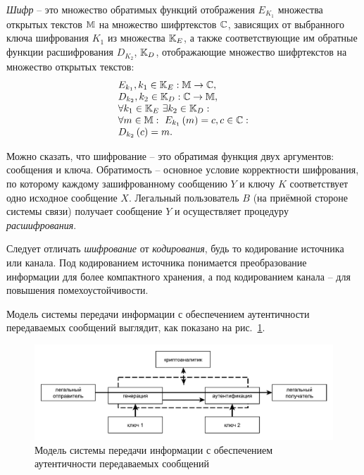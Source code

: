 \emph{Шифр} -- это множество обратимых функций отображения $E_{K_1}$ множества открытых текстов $\mathbb{M}$ на множество шифртекстов $\mathbb{C}$, зависящих от выбранного ключа шифрования $K_1$ из множества $\mathbb{K}_E$, а также соответствующие им обратные функции расшифрования $D_{K_2}$, $\mathbb{K}_D$, отображающие множество шифртекстов на множество открытых текстов:
\begin{equation}\label{eq:Encryption}\begin{array}{l}
	E_{k_1}, k_1 \in \mathbb{K}_E: \mathbb{M} \to \mathbb{C}, \\
	D_{k_2}, k_2 \in \mathbb{K}_D: \mathbb{C} \to \mathbb{M}, \\
	\forall k_1 \in \mathbb{K}_E ~ \exists k_2 \in \mathbb{K}_D: \\
	\forall m \in \mathbb{M}: ~ E_{k_1} \left( m \right) = c, c \in \mathbb{C}: \\
	D_{k_2} \left( c \right) = m.
\end{array}\end{equation}

Можно сказать, что шифрование -- это обратимая функция двух аргументов: сообщения и ключа. Обратимость -- основное условие корректности шифрования, по которому каждому зашифрованному сообщению $Y$ и ключу $K$ соответствует одно исходное сообщение $X$. Легальный пользователь $B$ (на приёмной стороне системы связи) получает сообщение $Y$ и осуществляет процедуру \emph{расшифрования}.

Следует отличать \emph{шифрование} от \emph{кодирования}, будь то кодирование источника или канала. Под кодированием источника понимается преобразование информации для более компактного хранения, а под кодированием канала -- для повышения помехоустойчивости.

Модель системы передачи информации с обеспечением аутентичности передаваемых сообщений выглядит, как показано на рис.~\ref{pic:model-auten}.

\begin{figure}[!thb]
	\centering
	\includegraphics[width=1.0\textwidth]{pic/model-auten}
	\caption{Модель системы передачи информации с обеспечением аутентичности передаваемых сообщений\label{pic:model-auten}}
\end{figure}

